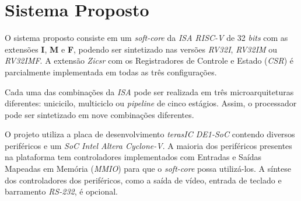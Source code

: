 \chapter{Sistema Proposto}\label{cap_proposta}

{ O sistema proposto consiste em um \textit{soft-core} da \textit{ISA RISC-V}
    de 32 \textit{bits} com as extensões \textbf{I}, \textbf{M} e \textbf{F},
    podendo ser sintetizado nas versões \textit{RV32I}, \textit{RV32IM} ou
    \textit{RV32IMF}. A extensão \textit{Zicsr} com os Registradores de Controle
    e Estado (\textit{CSR}) é parcialmente implementada em todas as três
    configurações.
}

{ Cada uma das combinações da \textit{ISA} pode ser realizada em três
    microarquiteturas diferentes: unicicilo, multiciclo ou \textit{pipeline} de
    cinco estágios. Assim, o processador pode ser sintetizado em nove
    combinações diferentes.
}

{ O projeto utiliza a placa de desenvolvimento \textit{terasIC DE1-SoC} contendo
    diversos periféricos e um \textit{SoC Intel Altera Cyclone-V}. A maioria dos
    periféricos presentes na plataforma tem controladores implementados com
    Entradas e Saídas Mapeadas em Memória (\textit{MMIO}) para que o
    \textit{soft-core} possa utilizá-los. A síntese dos controladores dos
    periféricos, como a saída de vídeo, entrada de teclado e barramento
    \textit{RS-232}, é opcional.
}

